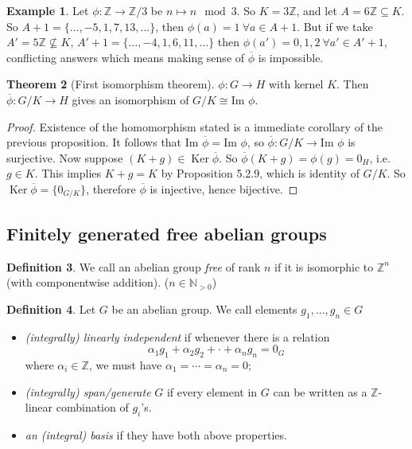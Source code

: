 \documentclass[a4paper]{article}
\newcommand{\Ker}{\operatorname{Ker}}
\theoremstyle{definition}
\newtheorem{defn}{Definition}[subsection]
\newtheorem{thm}[defn]{Theorem}
\newtheorem{example}[defn]{Example}
\begin{document}
\begin{example}
Let $\phi: \mathbb Z \rightarrow \mathbb Z/3$ be $n\mapsto n\mod 3$. So $K=3\mathbb Z$, and let $A=6\mathbb Z \subseteq K.$ So $A+1=\{\ldots,-5,1,7,13,\ldots\}$, then $\phi(a) = 1 \ \forall a\in A+1.$ But if we take $A'=5\mathbb Z \not\subseteq K$, $A'+1=\{\ldots,-4,1,6,11,\ldots\}$ then $\phi(a')=0,1,2 \ \forall a'\in A'+1$, conflicting answers which means making sense of $\overline{\phi}$ is impossible.
\end{example}
\begin{thm}[First isomorphism theorem]
$\phi : G\rightarrow H$ with kernel $K.$ Then $\overline{\phi}: G/K \rightarrow H$ gives an isomorphism of $G/K \cong \text{Im }\phi.$
\end{thm}
\begin{proof}
Existence of the homomorphism stated is a immediate corollary of the previous proposition. It follows that $\text{Im }\overline{\phi}=\text{Im }\phi$, so $\overline{\phi}: G/K \rightarrow \text{Im }\phi$ is surjective. Now suppose $(K+g)\in \Ker \overline{\phi}$. So $\overline{\phi}(K+g)=\phi(g)=0_H$, i.e. $g\in K$. This implies $K+g=K$ by Proposition 5.2.9, which is identity of $G/K$. So $\Ker \overline{\phi}=\{0_{G/K}\}$, therefore $\overline{\phi}$ is injective, hence bijective.
\end{proof}

\subsection{Finitely generated free abelian groups}
\begin{defn}
We call an abelian group \textit{free} of rank $n$ if it is isomorphic to $\mathbb Z^n$ (with componentwise addition). ($n\in \mathbb N_{>0}$)
\end{defn}
\begin{defn}
Let $G$ be an abelian group. We call elements $g_1,\ldots,g_n \in G$
\begin{itemize}
\item \textit{(integrally) linearly independent} if whenever there is a relation
\[
\alpha_1 g_1 + \alpha_2 g_2 + \cdot + \alpha_n g_n = 0_G
\]
where $\alpha_i \in \mathbb Z$, we must have $\alpha_1=\cdots=\alpha_n=0$;
\item \textit{(integrally) span/generate} $G$ if every element in $G$ can be written as a $\mathbb Z$-linear combination of $g_i$'s.
\item \textit{an (integral) basis} if they have both above properties.
\end{itemize}
\end{defn}
\end{document}
